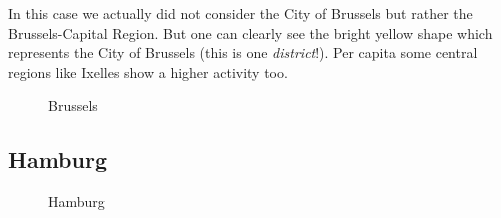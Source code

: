 In this case we actually did not consider the City of Brussels but rather the Brussels-Capital Region. But one can clearly see the bright yellow shape which represents the City of Brussels (this is one \emph{district}!). Per capita some central regions like Ixelles show a higher activity too. 
\begin{figure}[!htp]
	\hfill
	\caption{Brussels}\label{fig:madridmap}
\end{figure}

\subsection*{Hamburg}

\begin{figure}[!htp]
	\hfill
	\caption{Hamburg}
\end{figure}

